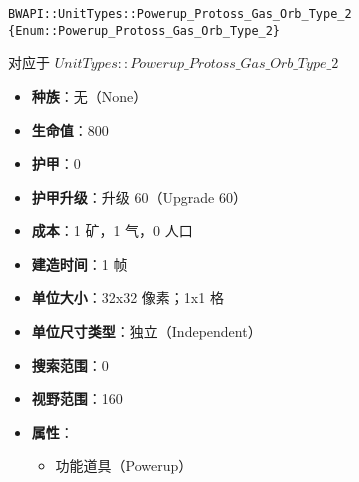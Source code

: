 \begin{tcolorbox}[colback=white, colframe=black!60!white, title=Powerup\_Protoss\_Gas\_Orb\_Type\_2(), arc=0mm]
    \begin{verbatim}
BWAPI::UnitTypes::Powerup_Protoss_Gas_Orb_Type_2 {Enum::Powerup_Protoss_Gas_Orb_Type_2}
    \end{verbatim}
    对应于  $UnitTypes::Powerup\_Protoss\_Gas\_Orb\_Type\_2$ 
    \begin{itemize}
        \item \textbf{种族}：无（None）
        \item \textbf{生命值}：800
        \item \textbf{护甲}：0
        \item \textbf{护甲升级}：升级 60（Upgrade 60）
        \item \textbf{成本}：1 矿，1 气，0 人口
        \item \textbf{建造时间}：1 帧
        \item \textbf{单位大小}：32x32 像素；1x1 格
        \item \textbf{单位尺寸类型}：独立（Independent）
        \item \textbf{搜索范围}：0
        \item \textbf{视野范围}：160
        \item \textbf{属性}：
            \begin{itemize}
                \item 功能道具（Powerup）
            \end{itemize}
    \end{itemize}
\end{tcolorbox}

